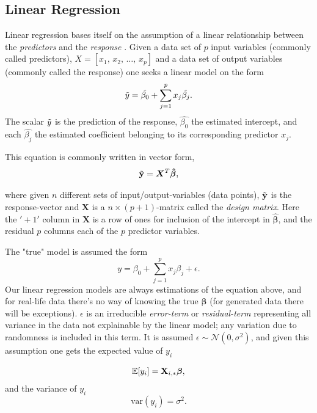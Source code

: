 \subsection{Linear Regression}
Linear regression bases itself on the assumption of a linear relationship between the \textit{predictors} and the \textit{response} \cite[p.21-26]{fahrmeir}. 
Given a data set of $p$ input variables (commonly called predictors), $X=[x_1, \, x_2, \, \ldots, \, x_p]$ and a data set of output variables (commonly called the response) one seeks a linear model on the form
\begin{equation}
\Tilde{y}=\hat{\beta_0}+\sum_{j=1}^{p}x_j\hat{\beta_j}.
\end{equation}
The scalar $\Tilde{y}$ is the prediction of the response, $\hat{\beta_0}$ the estimated intercept, and each $\hat{\beta_j}$ the estimated coefficient belonging to its corresponding predictor $x_j$. 

This equation is commonly written in vector form, 
\begin{equation}
\Tilde{\mathbf{y}}=\boldsymbol{X}^T\boldsymbol{\hat{\beta}},
\end{equation}

where given $n$ different sets of input/output-variables (data points), $\Tilde{\mathbf{y}}$ is the response-vector and $\boldsymbol{X}$ is a $n\times (p+1)$-matrix called the \textit{design matrix}\label{design-matrix}. Here the $'+1'$ column in $\boldsymbol{X}$ is a row of ones for inclusion of the intercept in $\boldsymbol{\hat{\beta}}$, and the residual $p$ columns each of the $p$ predictor variables. 


The "true" model is assumed the form 
\begin{equation}\label{OG_y}
y=\beta_0+\sum_{j=1}^{p}x_j\beta_j+\epsilon.
\end{equation}
Our linear regression models are always estimations of the equation above, and for real-life data there's no way of knowing the true $\boldsymbol{\beta}$ (for generated data there will be exceptions). 
$\epsilon$ is an irreducible \textit{error-term} or \textit{residual-term} representing all variance in the data not explainable by the linear model; any variation due to randomness is included in this term. It is assumed $\epsilon \sim  
\mathcal{N}(0,\sigma^2)$, and given this assumption one gets the expected value of $y_i$

\begin{equation}\label{expected_y}
    \mathbb{E}[y_i] = \mathbf{X}_{i,*}\boldsymbol{\beta},
\end{equation}
and the variance of $y_i$
\begin{equation}\label{var_y}
    \text{var}(y_i) = \sigma^2.
\end{equation}



